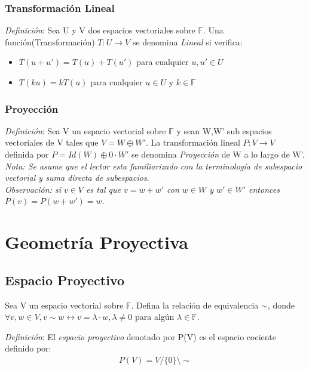 \documentclass[10pt,a4paper]{article}
\begin{document}
 
 
 
 \subsubsection{Transformación Lineal}
 
 \textit{Definición}: Sea U y V dos espacios vectoriales sobre $\mathbb{F}$. Una función(Transformación) $T:U \rightarrow V$ se denomina \textit{Lineal} si verifica: 
 
 \begin{itemize}
 \item $T(u+u')= T(u)+T(u')$ para cualquier $ u,u'\in U$
 \item $T(ku)=kT(u)$ para cualquier $u \in U$ y $k \in \mathbb{F}$
 \end{itemize}
 
 \subsubsection{Proyección}
 \textit{Definición}: Sea V un espacio vectorial sobre $\mathbb{F}$ y sean W,W' sub espacios vectoriales de V tales que $V=W\oplus W'$. La transformación lineal $P:V \rightarrow V$ definida por $P=Id(W)\oplus 0 \cdot W' $ se denomina \textit{Proyección} de W a lo largo de W'.
\textit{Nota: Se asume que el lector esta familiarizado con la terminología de subespacio vectorial y suma directa de subespacios}.
\\
\textit{Observación: si $v \in V $ es tal que $v=w+w'$ con $w \in W $ y $w' \in W'$ entonces $P(v)=P(w+w')=w$}.

\section{Geometría Proyectiva}

\subsection{Espacio Proyectivo}

Sea V un espacio vectorial sobre $\mathbb{F}$. Defina la relación de equivalencia $\sim$, donde $\forall v,w \in V, v \sim w \leftrightarrow v=\lambda \cdot w, \lambda \neq 0 $ para algún $\lambda  \in \mathbb{F}$.

\textit{Definición}: El \textit{espacio proyectivo} denotado por P(V) es el espacio cociente definido por:
\begin{align*}
P(V)= V/      \lbrace0\rbrace \setminus \sim
\end{align*}
\end{document}
